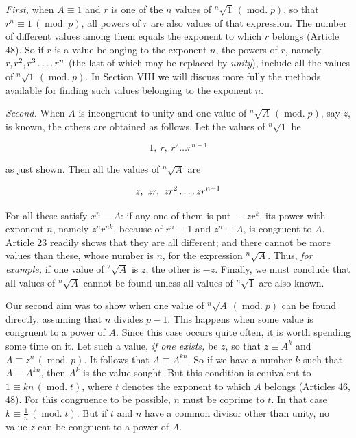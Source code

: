 \emph{First,} when $A\equiv1$ and $r$ is one of the $n$ values of ${}^{n}\!\surd {1}\,(\operatorname{mod.}p)$, so that $r^n\equiv1\,(\operatorname{mod.}p)$, all powers of $r$ are also values of that expression. The number of different values among them equals the exponent to which $r$ belongs (Article 48). So if $r$ is a value belonging to the exponent $n$, the powers of $r$, namely $r,r^2,r^3\mathinner{\ldotp\ldotp\ldotp\ldotp} r^n$ (the last of which may be replaced by \emph{unity}), include all the values of ${}^{n}\!\surd {1}\,(\operatorname{mod.}p)$. In Section VIII we will discuss more fully the methods available for finding such values belonging to the exponent $n$.

\emph{Second.} When $A$ is incongruent to unity and one value of ${}^{n}\!\surd {A}\,(\operatorname{mod.}p)$, say $z$, is known, the others are obtained as follows. Let the values of ${}^{n}\!\surd {1}$ be

\[1,\ r,\ r^2\ldots r^{n-1}\]

as just shown. Then all the values of ${}^{n}\!\surd {A}$ are

\[z,\ zr,\ zr^2\mathinner{\ldotp\ldotp\ldotp\ldotp} zr^{n-1}\]

For all these satisfy $x^n\equiv A$: if any one of them is put $\equiv zr^k$, its power with exponent $n$, namely $z^n r^{nk}$, because of $r^n\equiv1$ and $z^n\equiv A$, is congruent to $A$. Article 23 readily shows that they are all different; and there cannot be more values than these, whose number is $n$, for the expression ${}^{n}\!\surd {A}$. Thus, \emph{for example,} if one value of ${}^{2}\!\surd {A}$ is $z$, the other is $-z$. Finally,
we must conclude that all values of ${}^{n}\!\surd {A}$ cannot be found unless all values of ${}^{n}\!\surd {1}$ are also known.

Our second aim was to show when one value of ${}^{n}\!\surd {A}\,(\operatorname{mod.}p)$ can be found directly, assuming that $n$ divides $p-1$. This happens when some value is congruent to a power of $A$. Since this case occurs quite often, it is worth spending some time on it. Let such a value, \emph{if one exists,} be $z$, so that $z\equiv A^k$ and $A\equiv z^n\,(\operatorname{mod.}p)$. It follows that $A\equiv A^{kn}$. So if we have a number $k$ such that $A\equiv A^{kn}$, then $A^k$ is the value sought. But this condition is equivalent to $1\equiv kn\,(\operatorname{mod.}t)$, where $t$ denotes the exponent to which $A$ belongs (Articles 46, 48). For this congruence to be possible, $n$ must be coprime to $t$. In that case $k\equiv\frac{1}{n}\,(\operatorname{mod.}t)$. But if $t$ and $n$ have a common divisor other than unity, no value $z$ can be congruent to a power of $A$.

